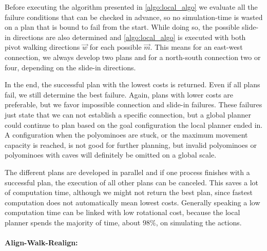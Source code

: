 Before executing the algorithm presented in \autoref{algo:local_algo} we evaluate all the failure conditions that can be checked in advance, so no simulation-time is wasted on a plan that is bound to fail from the start.
While doing so, the possible slide-in directions are also determined and \autoref{algo:local_algo} is executed with both pivot walking directions $\vec{w}$ for each possible $\vec{m}$.
This means for an east-west connection, we always develop two plans and for a north-south connection two or four, depending on the slide-in directions.

In the end, the successful plan with the lowest costs is returned.
Even if all plans fail, we still determine the best failure.
Again, plans with lower costs are preferable, but we favor impossible connection and slide-in failures.
These failures just state that we can not establish a specific connection, but a global planner could continue to plan based on the goal configuration the local planner ended in.
A configuration when the polyominoes are stuck, or the maximum movement capacity is reached, is not good for further planning, but invalid polyominoes or polyominoes with caves will definitely be omitted on a global scale.

The different plans are developed in parallel and if one process finishes with a successful plan, the execution of all other plans can be canceled.
This saves a lot of computation time, although we might not return the best plan, since fastest computation does not automatically mean lowest costs.
Generally speaking a low computation time can be linked with low rotational cost, because the local planner spends the majority of time, about $98\%$, on simulating the actions.

\paragraph{Align-Walk-Realign:}

